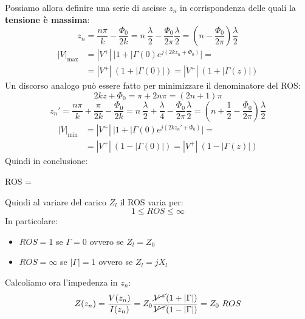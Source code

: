 Possiamo allora definire una serie di ascisse $z_n$ in corrispondenza delle quali la \textbf{tensione è massima}:
\begin{equation*}
    z_n = \frac{n\pi}{k} - \frac{\Phi_0}{2k} = n \ \frac{\lambda}{2} - \frac{\Phi_0}{2\pi} \frac{\lambda}{2} = \left(n - \frac{\Phi_0}{2\pi}\right) \frac{\lambda}{2} 
\end{equation*}
\begin{equation*}
\begin{aligned}
    |V|_{\max} &= |V^+| \ |1 + |\Gamma(0) e^{j(2kz_n + \Phi_0)}| =\\
    &= |V^+| \ (1 + |\Gamma(0)|) =|V^+| \ (1 + |\Gamma(z)|)
\end{aligned}
\end{equation*}
Un discorso analogo può essere fatto per minimizzare il denominatore del ROS\@:
\begin{equation*}
    2kz + \Phi_0 = \pi + 2n\pi = (2n+1)\pi
\end{equation*}
\begin{equation*}
    z_n' = \frac{n\pi}{k} + \frac{\pi}{2k} - \frac{\Phi_0}{2k} = n \ \frac{\lambda}{2} + \frac{\lambda}{4} - \frac{\Phi_0}{2\pi}  \frac{\lambda}{2} = \left(n + \frac{1}{2} - \frac{\Phi_0}{2\pi}\right) \frac{\lambda}{2} 
\end{equation*}
\begin{equation*}
\begin{aligned}
    |V|_{\min} &= |V^+| \ |1 + |\Gamma(0) e^{j(2k z_n' + \Phi_0)}| =\\
    &= |V^+| \ (1 - |\Gamma(0)|) =|V^+| \ (1 - |\Gamma(z)|)
\end{aligned}
\end{equation*}
Quindi in conclusione:
\begin{squared}[violet]
    ROS = 
\end{squared}
Quindi al variare del carico $Z_l$ il ROS varia per:
\begin{equation*}
    1 \leq ROS \leq \infty
\end{equation*}
In particolare:
\begin{itemize}
    \item $ROS = 1$ se $\Gamma = 0$ ovvero se $Z_l = Z_0$
    \item $ROS = \infty$ se $|\Gamma|=1$ ovvero se $Z_l = j X_l$
\end{itemize}
Calcoliamo ora l'impedenza in $z_n$:
\begin{equation*}
    Z(z_n) = \frac{V(z_n)}{I(z_n)} = Z_0 \frac{\cancel{V^+} (1 + |\Gamma|)}{\cancel{V^+} (1 - |\Gamma|)} = Z_0 \ ROS
\end{equation*}
